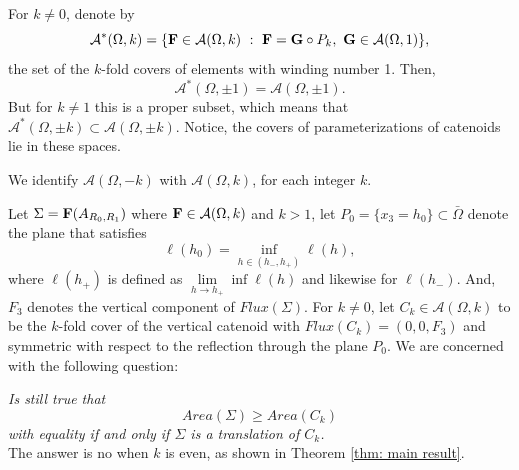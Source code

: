 \documentclass[11pt]{amsart}
\numberwithin{equation}{section}
\theoremstyle{theorem}
\theoremstyle{definition}
\numberwithin{equation}{section}
\begin{document}
For $k\neq 0$, denote by 
\begin{equation}
    \nonumber
    \mathcal{A}^*(\Omega ,k) =\{ \bold{F} \in \mathcal{A}(\Omega ,k)\ :\ \bold{F} = \bold{G} \circ P_k,\ \bold{G} \in \mathcal{A}(\Omega ,1)\},
\end{equation}
the set of the $k$-fold covers of elements with winding number 1. Then,
\begin{equation}
    \nonumber
    \mathcal{A}^*(\Omega ,\pm 1) = \mathcal{A}(\Omega ,\pm 1). 
\end{equation}
But for $k\neq 1$ this is a proper subset, which means that $\mathcal{A}^*(\Omega ,\pm k) \subset \mathcal{A}(\Omega ,\pm k)$. Notice, the covers of parameterizations of catenoids lie in these spaces. 
\medskip

We identify $\mathcal{A}(\Omega ,-k)$ with $\mathcal{A}(\Omega ,k)$, for each integer $k$. 
\medskip


Let $\Sigma = \bold{F}(A_{R_0,R_1}) $ where $\bold{F} \in \mathcal{A}(\Omega,k)$ and $k> 1$, let $P_0=\{x_3=h_0\}\subset \bar{\Omega}$ denote the plane that satisfies 
$$
\ell(h_0)=\underset{h\in (h_-,h_+)}{\inf}  \ell(h),
$$
where $\ell(h_+)$ is defined as $\underset{h\rightarrow h_+}{\lim} \inf \ell (h)$ and likewise for $\ell(h_-)$.
And, $F_3$ denotes the vertical component of $Flux (\Sigma)$. For $k\neq 0$, let $C_k\in \mathcal{A}(\Omega,k)$ to be the $k$-fold cover of the vertical catenoid with $Flux(C_k)=(0,0,F_3)$ and symmetric with respect to the reflection through the plane $P_0$. We are concerned with the following question:
\medskip

\textit{Is still true that
$$
Area (\Sigma) \geq Area (C_k)
$$
with equality if and only if $\Sigma$ is a translation of $C_k$.}\\
The answer is no when $k$ is even, as shown in Theorem \ref{thm: main result}.
\medskip
\end{document}
